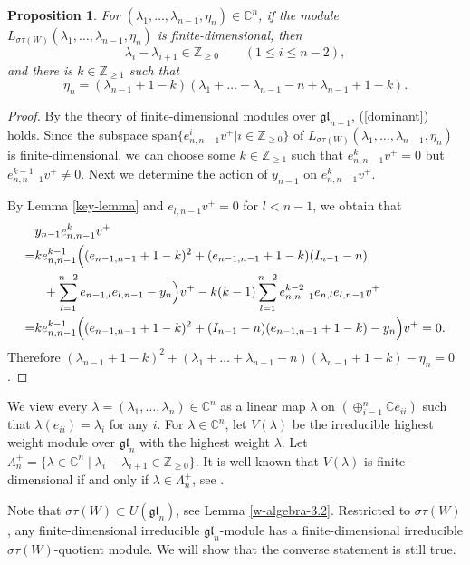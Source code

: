 \documentclass[12pt,a4paper]{amsart}
\newtheorem{proposition}[theorem]{Proposition}%
\numberwithin{equation}{section}
\newcommand{\C}{\mathbb C}
\newcommand{\Z}{\mathbb{Z}}
\def\gl{\mathfrak{gl}}
\def\l{\lambda}
\begin{document}
\begin{proposition}\label{finite-condition}For $(\l_1,\dots,\l_{n-1},\eta_n)\in \C^{n}$, if the module $L_{\sigma\tau(W)}(\l_1,\dots,\l_{n-1},\eta_n)$ is finite-dimensional, then
\begin{equation}\label{dominant}
\l_i-\l_{i+1}\in \Z_{\geq 0}\qquad(1\leq i\leq n-2),
\end{equation}
and  there is  $k\in \Z_{\geq 1}$
such that
$$\eta_n=
(\l_{n-1}+1-k)(\l_1+\dots+\l_{n-1}-n+\l_{n-1}+1-k).$$
\end{proposition}
\begin{proof}
By the theory of finite-dimensional modules over $\gl_{n-1}$,
(\ref{dominant}) holds. Since the subspace $\text{span}\{e_{n,n-1}^iv^+| i\in \Z_{\geq 0}\}$ of
$L_{\sigma\tau(W)}(\l_1,\dots,\l_{n-1},\eta_n)$  is finite-dimensional, we can choose some $k\in \Z_{\geq 1}$ such that
$e_{n,n-1}^kv^+=0$ but $e_{n,n-1}^{k-1}v^+\neq 0$. Next we determine the
action of $y_{n-1}$ on $e_{n,n-1}^kv^+$.


By Lemma \ref{key-lemma} and $e_{l,n-1}v^+=0$ for $l<n-1$,
we obtain that
$$\aligned &y_{n-1}e_{n,n-1}^kv^+\\
=&ke_{n,n-1}^{k-1}\Big( (e_{n-1,n-1}+1-k)^2+(e_{n-1,n-1}+1-k)(I_{n-1}-n)\\
&\ \ +\sum_{l=1}^{n-2} e_{n-1,l}e_{l,n-1}-y_n\Big)v^+
 -k(k-1)\sum_{l=1}^{n-2}e_{n,n-1}^{k-2}e_{n,l}e_{l,n-1}v^+\\
=&  ke_{n,n-1}^{k-1}\Big((e_{n-1,n-1}+1-k)^2+(I_{n-1}-n)(e_{n-1,n-1}+1-k)
-y_n\Big)v^+=0.
\endaligned$$
Therefore $(\l_{n-1}+1-k)^2+(\l_1+\dots+\l_{n-1}-n)(\l_{n-1}+1-k)
-\eta_n=0$.
\end{proof}


We view every  $\lambda=(\l_1,\dots,\l_{n})\in \C^n$
as a  linear map $\lambda$ on $(\oplus_{i=1}^n \C e_{ii})$
such that $\lambda(e_{ii})=\lambda_i$ for any $i$.
For $\l\in \C^{n}$, let $V(\l)$
be the irreducible highest weight module over $\gl_n$ with the highest weight $\lambda$. Let $\Lambda_n^+=\{\l\in \C^n\mid \l_i-\l_{i+1}\in \Z_{\geq 0}\}$.
It is well known that  $V(\l)$ is finite-dimensional if and only if $\l\in \Lambda_n^+$,
see \cite [Theorem 21.2]{H}.

Note that $\sigma\tau(W)\subset U(\gl_n)$, see Lemma \ref{w-algebra-3.2}. Restricted to $\sigma\tau(W)$, any finite-dimensional irreducible $\gl_n$-module has a finite-dimensional irreducible  $\sigma\tau(W)$-quotient module.
We will show that the converse statement is still true.
\end{document}
